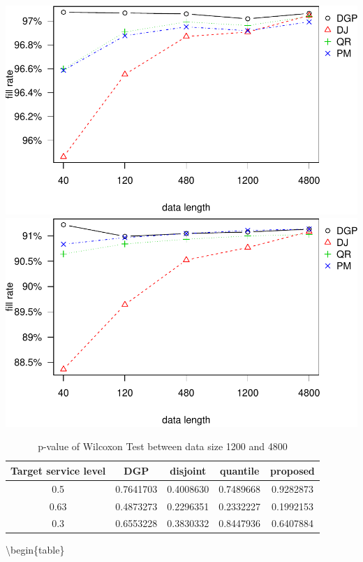 \documentclass[
]{article}
\begin{document}
\includegraphics{linear-norm-plot_files/figure-latex/fr-2.pdf}
\includegraphics{linear-norm-plot_files/figure-latex/fr-3.pdf}

\begin{table}

\caption{\label{tab:Wilcoxon}p-value of Wilcoxon Test between data size 1200 and 4800}
\centering
\begin{tabular}[t]{ccccc}
\toprule
Target service level & DGP & disjoint & quantile & proposed\\
\midrule
\rowcolor{gray!6}  0.5 & 0.7641703 & 0.4008630 & 0.7489668 & 0.9282873\\
0.63 & 0.4873273 & 0.2296351 & 0.2332227 & 0.1992153\\
\rowcolor{gray!6}  0.3 & 0.6553228 & 0.3830332 & 0.8447936 & 0.6407884\\
\bottomrule
\end{tabular}
\end{table}

\textbackslash begin\{table\}
\end{document}
